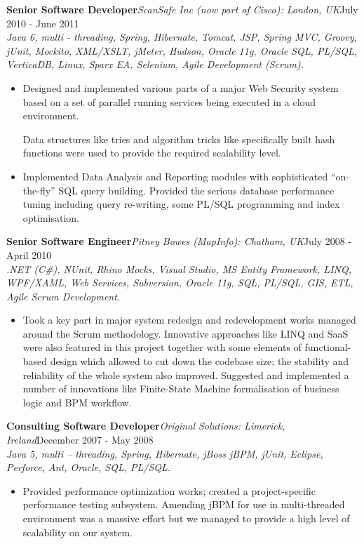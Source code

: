 \documentclass{res}
\newcommand{\jobdes}[4]{\needspace{3\baselineskip} %
{\noindent \bf #3\hspace{2ex}}{{\em \small #1}}{\hfill #2}\\{{\it \small #4.}}}
\newif\ifFullVersion
\begin{document}
\begin{resume}
\jobdes{ScanSafe Inc (now part of Cisco): London, UK}{July 2010 - June 2011}{Senior Software Developer}
{Java 6, multi - threading, Spring, Hibernate, Tomcat, JSP, Spring MVC, Groovy, jUnit, Mockito, XML/XSLT, jMeter, Hudson, Oracle 11g, Oracle SQL, PL/SQL, VerticaDB, Linux, Sparx EA, Selenium, Agile Development (Scrum)}
\begin{itemize} \itemsep -2pt %
 \item Designed and implemented various parts of a major Web Security system based on a set of parallel running services being executed in a cloud environment.
 \ifFullVersion
   This included a lot of re-design work, particularly switching from the standard Java objects to the immutable structures in combination with elements of functional-oriented programming.
\fi
Data structures like tries and algorithm tricks like specifically built hash functions were used to provide the required scalability level.
 \item Implemented Data Analysis and Reporting modules with sophisticated “on-the-fly” SQL query building. Provided the serious database performance tuning including query re-writing, some PL/SQL programming and index optimisation.
\end{itemize}

\jobdes{Pitney Bowes (MapInfo): Chatham, UK}{July 2008 - April 2010}{Senior Software Engineer}
{.NET (C\#), NUnit, Rhino Mocks, Visual Studio, MS Entity Framework, LINQ, WPF/XAML, Web Services, Subversion, Oracle 11g, SQL, PL/SQL, GIS, ETL, Agile Scrum Development}
\begin{itemize} \itemsep -2pt %
 \item Took a key part in major system redesign and redevelopment works managed around the Scrum methodology. Innovative approaches like LINQ and SaaS were also featured in this project together with some elements of functional-based design which allowed to cut down the codebase size; the stability and reliability of the whole system also improved. Suggested and implemented a number of innovations like Finite-State Machine formalisation of business logic and BPM workflow.
\end{itemize}

\jobdes {Original Solutions: Limerick, Ireland}{December 2007 - May 2008}{Consulting Software Developer}
{Java 5, multi – threading, Spring, Hibernate, jBoss jBPM, jUnit, Eclipse, Perforce, Ant, Oracle, SQL, PL/SQL}
\begin{itemize} \itemsep -2pt %
 \item Provided performance optimization works; created a project-specific performance testing subsystem. Amending jBPM for use in multi-threaded environment was a massive effort but we managed to provide a high level of scalability on our system.
\end{itemize}


\end{resume}
\end{document}
